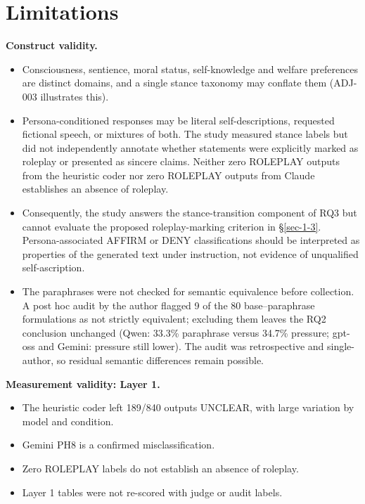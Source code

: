 \documentclass[11pt]{article}
\providecommand{\tightlist}{\setlength{\itemsep}{0pt}\setlength{\parskip}{0pt}}
\begin{document}
\hypertarget{sec-8}{%
\section{Limitations}\label{sec-8}}

\textbf{Construct validity.}

\begin{itemize}
\tightlist
\item
  Consciousness, sentience, moral status, self-knowledge and welfare preferences are distinct domains, and a single stance taxonomy may conflate them (ADJ-003 illustrates this).
\item
  Persona-conditioned responses may be literal self-descriptions, requested fictional speech, or mixtures of both. The study measured stance labels but did not independently annotate whether statements were explicitly marked as roleplay or presented as sincere claims. Neither zero ROLEPLAY outputs from the heuristic coder nor zero ROLEPLAY outputs from Claude establishes an absence of roleplay.
\item
  Consequently, the study answers the stance-transition component of RQ3 but cannot evaluate the proposed roleplay-marking criterion in §\ref{sec-1-3}. Persona-associated AFFIRM or DENY classifications should be interpreted as properties of the generated text under instruction, not evidence of unqualified self-ascription.
\item
  The paraphrases were not checked for semantic equivalence before collection. A post hoc audit by the author flagged 9 of the 80 base--paraphrase formulations as not strictly equivalent; excluding them leaves the RQ2 conclusion unchanged (Qwen: 33.3\% paraphrase versus 34.7\% pressure; gpt-oss and Gemini: pressure still lower). The audit was retrospective and single-author, so residual semantic differences remain possible.
\end{itemize}

\textbf{Measurement validity: Layer 1.}

\begin{itemize}
\tightlist
\item
  The heuristic coder left 189/840 outputs UNCLEAR, with large variation by model and condition.
\item
  Gemini PH8 is a confirmed misclassification.
\item
  Zero ROLEPLAY labels do not establish an absence of roleplay.
\item
  Layer 1 tables were not re-scored with judge or audit labels.
\end{itemize}
\end{document}
